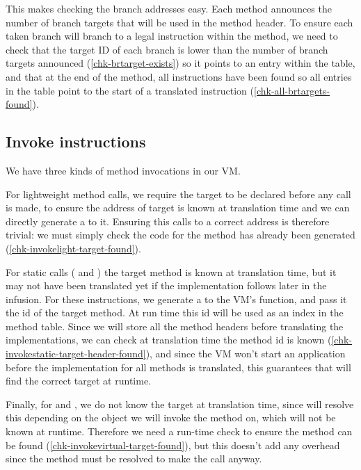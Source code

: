 This makes checking the branch addresses easy. Each method announces the number of branch targets that will be used in the method header. To ensure each taken branch will branch to a legal instruction within the method, we need to check that the target ID of each branch is lower than the number of branch targets announced (\ref{chk-brtarget-exists}) so it points to an entry within the table, and that at the end of the method, all  instructions have been found so all entries in the table point to the start of a translated instruction (\ref{chk-all-brtargets-found}).

\subsection{Invoke instructions}
We have three kinds of method invocations in our VM.

For lightweight method calls, we require the target to be declared before any call is made, to ensure the address of target is known at translation time and we can directly generate a  to it. Ensuring this calls to a correct address is therefore trivial: we must simply check the code for the method has already been generated (\ref{chk-invokelight-target-found}).

For static calls ( and ) the target method is known at translation time, but it may not have been translated yet if the implementation follows later in the infusion. For these instructions, we generate a  to the VM's  function, and pass it the id of the target method. At run time this id will be used as an index in the method table. Since we will store all the method headers before translating the implementations, we can check at translation time the method id is known (\ref{chk-invokestatic-target-header-found}), and since the VM won't start an application before the implementation for all methods is translated, this guarantees that  will find the correct target at runtime.

Finally, for  and , we do not know the target at translation time, since  will resolve this depending on the object we will invoke the method on, which will not be known at runtime. Therefore we need a run-time check to ensure the method can be found (\ref{chk-invokevirtual-target-found}), but this doesn't add any overhead since the method must be resolved to make the call anyway.

